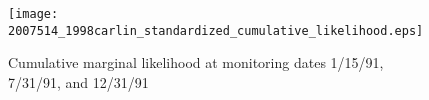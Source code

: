 \begin{figure}
\centering
\texttt{[image: 2007514\_1998carlin\_standardized\_cumulative\_likelihood.eps]}
\caption{Cumulative marginal likelihood at monitoring dates 1/15/91, 7/31/91, and 12/31/91}
\label{fig:1998carlin_marg}
\end{figure}